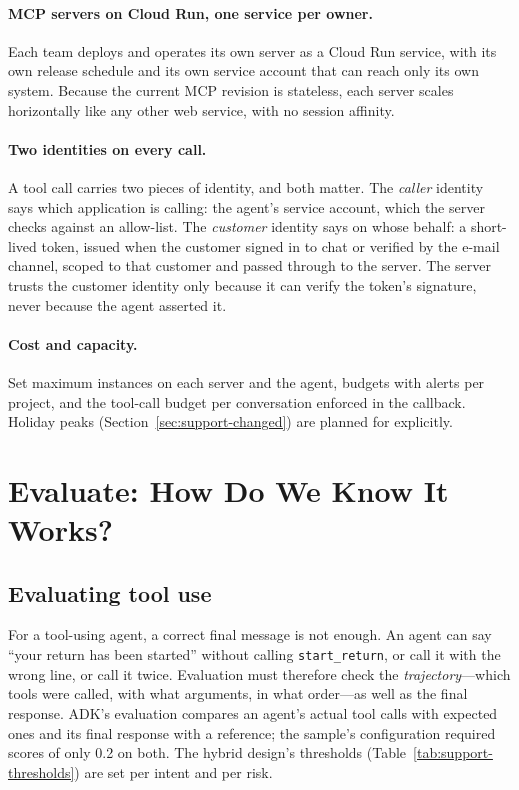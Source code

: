 \paragraph{MCP servers on Cloud Run, one service per owner.} Each team deploys and operates its own server as a Cloud Run service, with its own release schedule and its own service account that can reach only its own system. Because the current MCP revision is stateless, each server scales horizontally like any other web service, with no session affinity.

\paragraph{Two identities on every call.} A tool call carries two pieces of identity, and both matter. The \emph{caller} identity says which application is calling: the agent's service account, which the server checks against an allow-list. The \emph{customer} identity says on whose behalf: a short-lived token, issued when the customer signed in to chat or verified by the e-mail channel, scoped to that customer and passed through to the server. The server trusts the customer identity only because it can verify the token's signature, never because the agent asserted it.

\paragraph{Cost and capacity.} Set maximum instances on each server and the agent, budgets with alerts per project, and the tool-call budget per conversation enforced in the callback. Holiday peaks (Section~\ref{sec:support-changed}) are planned for explicitly.

\section{Evaluate: How Do We Know It Works?}
\label{sec:support-evaluate}

\subsection{Evaluating tool use}

For a tool-using agent, a correct final message is not enough. An agent can say ``your return has been started'' without calling \texttt{start\_return}, or call it with the wrong line, or call it twice. Evaluation must therefore check the \emph{trajectory}---which tools were called, with what arguments, in what order---as well as the final response. ADK's evaluation compares an agent's actual tool calls with expected ones and its final response with a reference; the sample's configuration required scores of only 0.2 on both. The hybrid design's thresholds (Table~\ref{tab:support-thresholds}) are set per intent and per risk.

